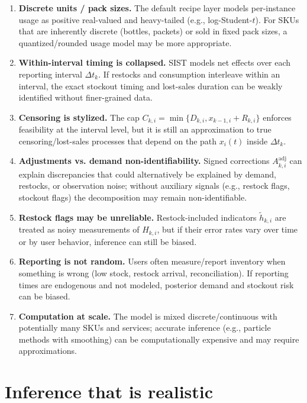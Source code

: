 \documentclass[11pt]{article}
\begin{document}
\begin{enumerate}
  \item \textbf{Discrete units / pack sizes.} The default recipe layer models per-instance usage as positive real-valued and heavy-tailed (e.g., log-Student-$t$). For SKUs that are inherently discrete (bottles, packets) or sold in fixed pack sizes, a quantized/rounded usage model may be more appropriate.

  \item \textbf{Within-interval timing is collapsed.} SIST models net effects over each reporting interval $\Delta t_k$. If restocks and consumption interleave within an interval, the exact stockout timing and lost-sales duration can be weakly identified without finer-grained data.

  \item \textbf{Censoring is stylized.} The cap $C_{k,i}=\min\{D_{k,i},x_{k-1,i}+R_{k,i}\}$ enforces feasibility at the interval level, but it is still an approximation to true censoring/lost-sales processes that depend on the path $x_i(t)$ inside $\Delta t_k$.

  \item \textbf{Adjustments vs. demand non-identifiability.} Signed corrections $A^{\mathrm{adj}}_{k,i}$ can explain discrepancies that could alternatively be explained by demand, restocks, or observation noise; without auxiliary signals (e.g., restock flags, stockout flags) the decomposition may remain non-identifiable.

  \item \textbf{Restock flags may be unreliable.} Restock-included indicators $\tilde h_{k,i}$ are treated as noisy measurements of $H_{k,i}$, but if their error rates vary over time or by user behavior, inference can still be biased.

  \item \textbf{Reporting is not random.} Users often measure/report inventory when something is wrong (low stock, restock arrival, reconciliation). If reporting times are endogenous and not modeled, posterior demand and stockout risk can be biased.

  \item \textbf{Computation at scale.} The model is mixed discrete/continuous with potentially many SKUs and services; accurate inference (e.g., particle methods with smoothing) can be computationally expensive and may require approximations.
\end{enumerate}

\section{Inference that is realistic}
\end{document}
